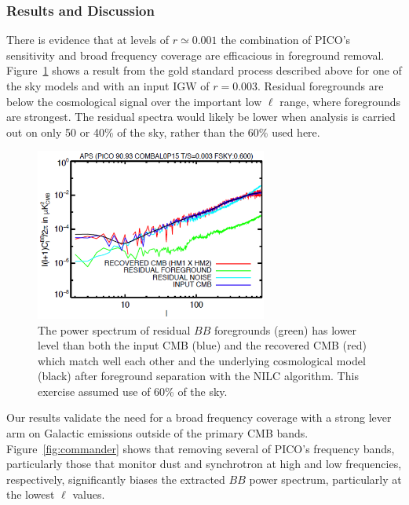 \documentclass[PICOReport.tex]{subfiles}
\begin{document}


\subsubsection{Results and Discussion}

There is evidence that at levels of $r \simeq 0.001$ the combination of PICO's sensitivity and broad frequency coverage are efficacious in foreground removal. Figure~\ref{fig:nilc} shows a result from the gold standard process described above for one of the sky models and with an input \ac{IGW} of $r=0.003$. Residual foregrounds are below the cosmological signal over the important low $\ell$ range, where foregrounds are strongest. The residual spectra would likely be lower when analysis is carried out on only 50 or 40\% of the sky, rather than the 60\% used here. 

\begin{figure}
\hspace{-0.1in}
\parbox{3.0in}{\centerline {
\includegraphics[width=3.0in]{images/soumen_NILC_foregrounds_93.png}}}
\hspace{0.25in}
\parbox{3.0in}{
\caption{The power spectrum of residual $BB$ foregrounds (green) has lower level than both the input CMB (blue) and the recovered CMB (red) which match well each other and the underlying cosmological model (black) after foreground separation with the NILC algorithm. This exercise assumed use of 60\% of the sky.   
\label{fig:nilc}}}
\vspace{-0.1in}
\end{figure}

Our results validate the need for a broad frequency coverage with a strong lever arm on Galactic emissions outside of the primary CMB bands. Figure~\ref{fig:commander} shows that removing several of PICO's frequency bands, particularly those that monitor dust and synchrotron at high and low frequencies, respectively, significantly biases the extracted $BB$ power spectrum, particularly at the lowest $\ell$ values. 
\end{document}
